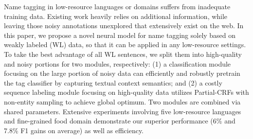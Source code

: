 Name tagging in low-resource languages or domains suffers from inadequate training data. Existing work heavily relies on additional information, while leaving those noisy annotations unexplored that extensively exist on the web. In this paper, we propose a novel neural model for name tagging solely based on weakly labeled (WL) data, so that it can be applied in any low-resource settings. To take the best advantage of all WL sentences, we split them into high-quality and noisy portions for two modules, respectively: (1) a classification module focusing on the large portion of noisy data can efficiently and robustly pretrain the tag classifier by capturing textual context semantics; and (2) a costly sequence labeling module focusing on high-quality data utilizes Partial-CRFs with non-entity sampling to achieve global optimum. Two modules are combined via shared parameters. Extensive experiments involving five low-resource languages and fine-grained food domain demonstrate our superior performance (6\% and 7.8\% F1 gains on average) as well as efficiency.